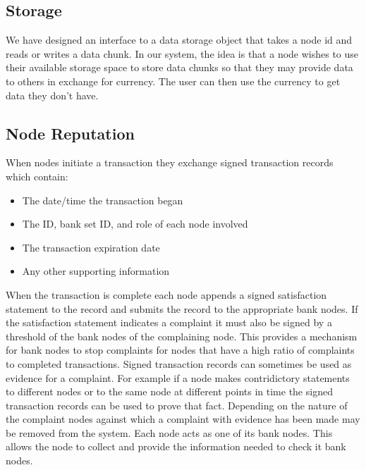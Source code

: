 \documentclass[%
				10pt,
        final,
        notitlepage,
        narroweqnarray,
        inline,
        twoside,
        ]{ieee}
\begin{document}
\subsection{Storage}
We have designed an interface to a data storage object that takes a node id and reads or writes a data chunk.  In our system, the idea is that a node wishes to use their available storage space to store data chunks so that they may provide data to others in exchange for currency.  The user can then use the currency to get data they don't have. 

\subsection{Node Reputation}
When nodes initiate a transaction they exchange signed transaction records which contain:
\begin{itemize}
\item The date/time the transaction began
\item The ID, bank set ID, and role of each node involved
\item The transaction expiration date
\item Any other supporting information
\end{itemize}
When the transaction is complete each node appends a signed satisfaction statement to the record and submits the record to the appropriate bank nodes. If the satisfaction statement indicates a complaint it must also be signed by a threshold of the bank nodes of the complaining node.  This provides a mechanism for bank nodes to stop complaints for nodes that have a high ratio of complaints to completed transactions.  Signed transaction records can sometimes be used as evidence for a complaint.  For example if a node makes contridictory statements to different nodes or to the same node at different points in time the signed transaction records can be used to prove that fact.  Depending on the nature of the complaint nodes against which a complaint with evidence has been made may be removed from the system.  Each node acts as one of its bank nodes.  This allows the node to collect and provide the information needed to check it bank nodes.
\end{document}
